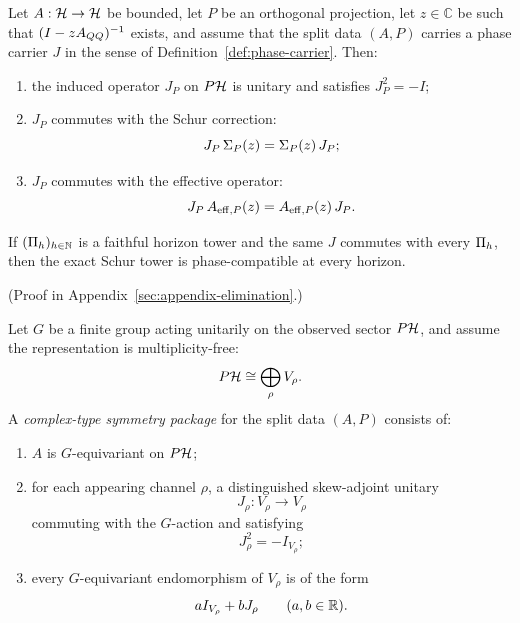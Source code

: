 \begin{theorem}
\label{thm:phase-compatible-schur-tower}
Let $A:\mathcal{H}\to\mathcal{H}$ be bounded, let $P$ be an orthogonal projection, let
$z\in\mathbb{C}$ be such that $(I-zA_{QQ})^{-1}$ exists, and assume that
the split data $(A,P)$ carries a phase carrier $J$ in the sense of
Definition~\ref{def:phase-carrier}. Then:
\begin{enumerate}[label=(\roman*), leftmargin=2em, itemsep=0.2em]
\item the induced operator $J_P$ on $P\mathcal{H}$ is unitary and satisfies
      $J_P^2=-I$;
\item $J_P$ commutes with the Schur correction:
      \[
      J_P\,\Sigma_{P}(z)=\Sigma_{P}(z)\,J_P;
      \]
\item $J_P$ commutes with the effective operator:
      \[
      J_P\,A_{\mathrm{eff},P}(z)=A_{\mathrm{eff},P}(z)\,J_P.
      \]
\end{enumerate}
If $(\Pi_{h})_{h\in\mathbb{N}}$ is a faithful horizon tower and the same $J$
commutes with every $\Pi_{h}$, then the exact Schur tower is phase-compatible
at every horizon.
\end{theorem}

(Proof in Appendix~\ref{sec:appendix-elimination}.)

\begin{definition}
\label{def:complex-type-symmetry-package}
Let $G$ be a finite group acting unitarily on the observed sector $P\mathcal{H}$, and
assume the representation is multiplicity-free:
\[
P\mathcal{H} \cong \bigoplus_{\rho} V_{\rho}.
\]
A \emph{complex-type symmetry package} for the split data $(A,P)$ consists of:
\begin{enumerate}[label=(\roman*), leftmargin=2em, itemsep=0.2em]
\item $A$ is $G$-equivariant on $P\mathcal{H}$;
\item for each appearing channel $\rho$, a distinguished skew-adjoint unitary
      \[
      J_{\rho}:V_{\rho}\to V_{\rho}
      \]
      commuting with the $G$-action and satisfying
      \[
      J_{\rho}^2=-I_{V_{\rho}};
      \]
\item every $G$-equivariant endomorphism of $V_{\rho}$ is of the form
      \[
      a I_{V_{\rho}} + b J_{\rho}
      \qquad(a,b\in\mathbb{R}).
      \]
\end{enumerate}
\end{definition}

